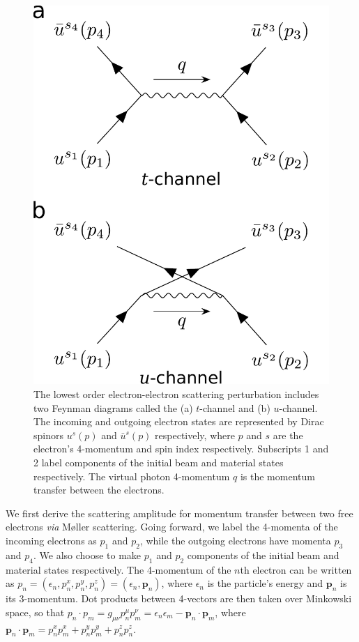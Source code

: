 \documentclass[twoside,twocolumn,9pt]{article}
\begin{document}
\begin{figure}
  \centering
  \includegraphics[width=.38\textwidth]{figures/tu_portrait.pdf}
  \caption{
    The lowest order electron-electron scattering perturbation includes two
    Feynman diagrams called the (a) $t$-channel and (b) $u$-channel.
    The incoming and outgoing electron states are represented by Dirac spinors
    $u^s(p)$ and $\bar{u}^s(p)$ respectively, where $p$ and $s$ are the electron's
    4-momentum and spin index respectively.
    Subscripts 1 and 2 label components of the initial beam and material states
    respectively.
    The virtual photon 4-momentum $q$ is the momentum transfer between the
    electrons.
  }
\label{fig:tu}
\end{figure}

We first derive the scattering amplitude for momentum transfer between two free
electrons \textit{via} M{\o}ller scattering. \cite{Moller1932, Kragh1992,
Roqu1992}
Going forward, we label the 4-momenta of the incoming electrons as $p_1$ and
$p_2$, while the outgoing electrons have momenta $p_3$ and $p_4$.
We also choose to make $p_1$ and $p_2$ components of the initial beam and
material states respectively.
The 4-momentum of the $n$th electron can be written as
$p_n = (\epsilon_n, p_n^x, p_n^y, p_n^z) = (\epsilon_n, \mathbf{p}_n)$,
where $\epsilon_n$ is the particle's energy and $\mathbf{p}_n$ is its
3-momentum.
Dot products between 4-vectors are then taken over Minkowski space, so that
$p_n\cdot p_m
=
g_{\mu\nu}p_n^\mu p_m^\nu
=
\epsilon_n\epsilon_m -
\mathbf{p}_n\cdot\mathbf{p}_m$,
where
$\mathbf{p}_n\cdot\mathbf{p}_m
=
p_n^xp_m^x + p_n^yp_m^y + p_n^zp_n^z$.   
\end{document}
